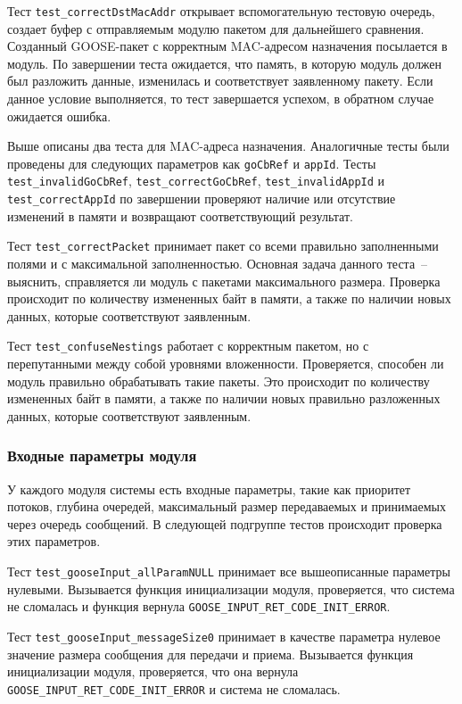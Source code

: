 Тест \lstinline{test_correctDstMacAddr} открывает вспомогательную тестовую очередь, создает буфер с отправляемым модулю пакетом для дальнейшего сравнения.
Созданный GOOSE-пакет с корректным  MAC-адресом назначения посылается в модуль. По завершении теста ожидается, что память, в которую модуль должен был разложить данные, изменилась и соответствует заявленному пакету. Если данное условие выполняется, то тест завершается успехом, в обратном случае ожидается ошибка.

Выше описаны два теста для MAC-адреса назначения. Аналогичные тесты были проведены для следующих параметров как \lstinline{goCbRef} и \lstinline{appId}.
Тесты \lstinline{test_invalidGoCbRef}, \lstinline{test_correctGoCbRef}, \lstinline{test_invalidAppId} и \lstinline{test_correctAppId} по завершении проверяют наличие или отсутствие изменений в памяти и возвращают соответствующий результат.

Тест \lstinline{test_correctPacket} принимает пакет со всеми правильно заполненными полями и с максимальной заполненностью. Основная задача данного теста~-- выяснить, справляется ли модуль с пакетами максимального размера. Проверка происходит по количеству измененных байт в памяти, а также по наличии новых данных, которые соответствуют заявленным.

Тест \lstinline{test_confuseNestings} работает с корректным пакетом, но с перепутанными между собой уровнями вложенности. Проверяется, способен ли модуль правильно обрабатывать такие пакеты. Это происходит по количеству измененных байт в памяти, а также по наличии новых правильно разложенных данных, которые соответствуют заявленным.

\subsubsection{Входные параметры модуля}

У каждого модуля системы есть входные параметры, такие как приоритет потоков, глубина очередей, максимальный размер передаваемых и принимаемых через очередь сообщений. В следующей подгруппе тестов происходит проверка этих параметров.

Тест \lstinline{test_gooseInput_allParamNULL} принимает все вышеописанные параметры нулевыми. Вызывается функция инициализации модуля, проверяется, что система не сломалась и функция вернула \lstinline{GOOSE_INPUT_RET_CODE_INIT_ERROR}.

Тест \lstinline{test_gooseInput_messageSize0} принимает в качестве параметра нулевое значение размера сообщения для передачи и приема. Вызывается функция инициализации модуля, проверяется, что она вернула \lstinline{GOOSE_INPUT_RET_CODE_INIT_ERROR} и система не сломалась.

